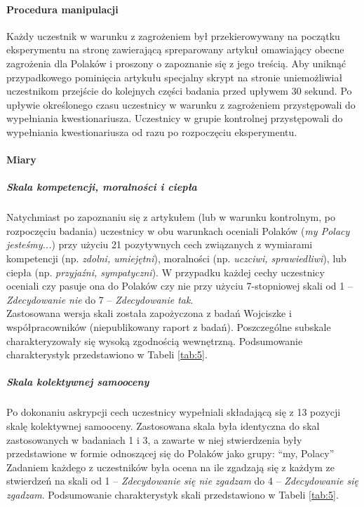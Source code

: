 \documentclass[man]{apa6}
\begin{document}
\paragraph{Procedura manipulacji}
Każdy uczestnik w warunku z zagrożeniem był przekierowywany na początku eksperymentu na stronę zawierającą spreparowany artykuł omawiający obecne zagrożenia dla Polaków i proszony o zapoznanie się z jego treścią. Aby uniknąć przypadkowego pominięcia artykułu specjalny skrypt na stronie uniemożliwiał uczestnikom przejście do kolejnych części badania przed upływem 30 sekund. Po upływie określonego czasu uczestnicy w warunku z zagrożeniem przystępowali do wypełniania kwestionariusza. Uczestnicy w grupie kontrolnej przystępowali do wypełniania kwestionariusza od razu po rozpoczęciu eksperymentu. \\


\paragraph{Miary}
\subparagraph{Skala kompetencji, moralności i ciepła}
Natychmiast po zapoznaniu się z artykułem (lub w warunku kontrolnym, po rozpoczęciu badania) uczestnicy w obu warunkach oceniali Polaków (\emph{my Polacy jesteśmy...}) przy użyciu 21 pozytywnych cech związanych z wymiarami kompetencji (np. \emph{zdolni, umiejętni}), moralności (np. \emph{uczciwi, sprawiedliwi}), lub ciepła (np. \emph{przyjaźni, sympatyczni}). W przypadku każdej cechy uczestnicy oceniali czy pasuje ona do Polaków czy nie przy użyciu 7-stopniowej skali od 1 -- \emph{Zdecydowanie nie} do 7 -- \emph{Zdecydowanie tak}.\\
Zastosowana wersja skali została zapożyczona z badań Wojciszke i współpracowników (niepublikowany raport z badań). Poszczególne subskale charakteryzowały się wysoką zgodnością wewnętrzną. Podsumowanie charakterystyk przedstawiono w Tabeli \ref{tab:5}.

\subparagraph{Skala kolektywnej samooceny}
Po dokonaniu askrypcji cech uczestnicy wypełniali składającą się z 13 pozycji skalę kolektywnej samooceny. Zastosowana skala była identyczna do skal zastosowanych w badaniach 1 i 3, a zawarte w niej stwierdzenia były przedstawione w formie odnoszącej się do Polaków jako grupy: ``my, Polacy'' Zadaniem każdego z uczestników była ocena na ile zgadzają się z każdym ze stwierdzeń na skali od 1 -- \emph{Zdecydowanie się nie zgadzam} do 4 -- \emph{Zdecydowanie się zgadzam}. Podsumowanie charakterystyk skali przedstawiono w Tabeli \ref{tab:5}.
\end{document}
